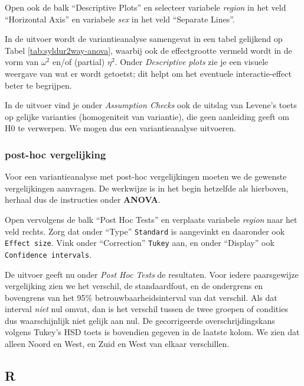 \documentclass[
]{book}
\begin{document}
Open ook de balk ``Descriptive Plots'' en selecteer variabele \emph{region} in het veld ``Horizontal Axis'' en variabele \emph{sex} in het veld ``Separate Lines''.

In de uitvoer wordt de variantieanalyse samengevat in een tabel gelijkend op Tabel \ref{tab:syldur2way-anova}, waarbij ook de effectgrootte vermeld wordt in de vorm van \(\omega^2\) en/of (partial) \(\eta^2\). Onder \emph{Descriptive plots} zie je een visuele weergave van wat er wordt getoetst; dit helpt om het eventuele interactie-effect beter te begrijpen.

In de uitvoer vind je onder \emph{Assumption Checks} ook de uitslag van Levene's toets op gelijke
varianties (homogeniteit van variantie), die geen aanleiding geeft om H0
te verwerpen. We mogen dus een variantieanalyse uitvoeren.

\hypertarget{post-hoc-vergelijking-2}{%
\subsubsection{post-hoc vergelijking}\label{post-hoc-vergelijking-2}}

Voor een variantieanalyse met post-hoc vergelijkingen moeten we de
gewenste vergelijkingen aanvragen. De werkwijze is in het begin
hetzelfde als hierboven, herhaal dus de instructies onder \textbf{ANOVA}.

Open vervolgens de balk ``Post Hoc Tests'' en verplaats variabele \emph{region} naar het veld rechts. Zorg dat onder ``Type'' \texttt{Standard} is aangevinkt en daaronder ook \texttt{Effect\ size}. Vink onder ``Correction'' \texttt{Tukey} aan, en onder ``Display'' ook \texttt{Confidence\ intervals}.

De uitvoer geeft nu onder \emph{Post Hoc Tests} de resultaten.
Voor iedere paarsgewijze vergelijking zien we het verschil, de
standaardfout, en de ondergrens en bovengrens van het 95\% betrouwbaarheidsinterval van dat verschil.
Als dat interval \emph{niet} nul omvat, dan is het verschil tussen de twee
groepen of condities dus waarschijnlijk niet gelijk aan nul. De
gecorrigeerde overschrijdingskans volgens Tukey's HSD toets is bovendien
gegeven in de laatste kolom. We zien dat alleen Noord en West, en Zuid en West van elkaar verschillen.

\hypertarget{r-16}{%
\subsection{R}\label{r-16}}
\end{document}
